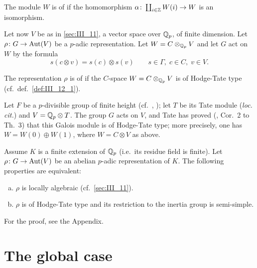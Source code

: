 \begin{mydef}\label{def:III_12_1}
	The module $W$ is of %
	if the homomorphism $\alpha\colon \coprod_{i\in\mathbb{Z}} W(i) \to W$ is an
	isomorphism.
\end{mydef}

Let now $V$ be as in \ref{sec:III_11}, a vector space over $\mathbb{Q}_p$, of finite
dimension. Let $\rho\colon G \to \operatorname{Aut}(V)$ be a $p$-adic representation. Let $W
= C \otimes_{\mathbb{Q}_p} V$ and let $G$ act on $W$ by the formula
\dpage
\[
	s(c\otimes v) = s(c) \otimes s(v) \qquad
	s\in \Gamma, \; c\in C, \; v\in V.
\]
\begin{mydef}
	The representation $\rho$ is of %
	 if the $C$-space $W = C \otimes_{\mathbb{Q}_p} V$ is of
	Hodge-Tate type (cf.\ def.~\ref{def:III_12_1}).
\end{mydef}

\begin{ex}
	Let $F$ be a $p$-divisible group of finite height (cf.\ \cite{26},
	\cite{39}); let $T$ be its Tate module (\emph{loc. cit.}) and $V = \mathbb{Q}_p
	\otimes T$. The group $G$ acts on $V$, and Tate has proved (\cite{39},
	Cor.~2 to Th.~3) that this Galois module is of Hodge-Tate type; more
	precisely, one has $W = W(0) \oplus W(1)$, where $W = C \otimes V$ as
	above.
\end{ex}
\begin{thm}[Tate]
Assume $K$ is a finite extension of $\mathbb{Q}_p$ (i.e.\ its residue field is finite).
Let $\rho\colon G \to \operatorname{Aut}(V)$ be an abelian $p$-adic representation of $K$.
The following properties are equivalent:
\begin{enumerate}[(a)]
\item $\rho$ is locally algebraic (cf.\ \ref{sec:III_11}).
\item $\rho$ is of Hodge-Tate type and its restriction to the inertia group is
	semi-simple.
\end{enumerate}
\end{thm}
For the proof, see the Appendix.

\section{The global case}
